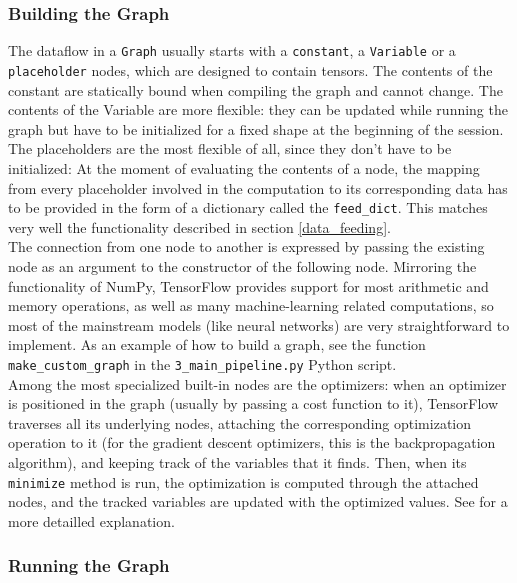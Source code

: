   \subsubsection{Building the Graph}

  The dataflow in a \texttt{Graph} usually starts with a \texttt{constant}, a \texttt{Variable} or a \texttt{placeholder} nodes, which are designed to contain tensors. The contents of the constant are statically bound when compiling the graph and cannot change. The contents of the Variable are more flexible: they can be updated while running the graph but have to be initialized for a fixed shape at the beginning of the session. The placeholders are the most flexible of all, since they don't have to be initialized: At the moment of evaluating the contents of a node, the mapping from every placeholder involved in the computation to its corresponding data has to be provided in the form of a dictionary called the \texttt{feed\_dict}. This matches very well the functionality described in section \ref{data_feeding}.\\

  The connection from one node to another is expressed by passing the existing node as an argument to the constructor of the following node. Mirroring the functionality of NumPy, TensorFlow provides support for most arithmetic and memory operations, as well as many machine-learning related computations, so most of the mainstream models (like neural networks) are very straightforward to implement. As an example of how to build a graph, see the function \texttt{make\_custom\_graph} in the \texttt{3\_main\_pipeline.py} Python script.\\

  Among the most specialized built-in nodes are the optimizers: when an optimizer is positioned in the graph (usually by passing a cost function to it), TensorFlow traverses all its underlying nodes, attaching the corresponding optimization operation to it (for the gradient descent optimizers, this is the backpropagation algorithm), and keeping track of the variables that it finds. Then, when its \texttt{minimize} method is run, the optimization is computed through the attached nodes, and the tracked variables are updated with the optimized values. See \cite[p.212]{goodfellow} for a more detailled explanation.


  \subsubsection{Running the Graph}

